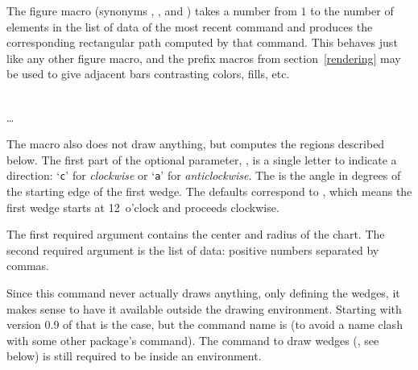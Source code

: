 \documentclass[letterpaper]{article}
\begin{document}
The figure macro  (synonyms , ,
and ) takes a number from $1$ to the number of elements in
the list of data of the most recent  command and produces
the corresponding rectangular path computed by that command. This
behaves just like any other figure macro, and the prefix macros from
section~\ref{rendering} may be used to give adjacent bars contrasting
colors, fills, etc.


\begin{cd}
%
    \\
\dots
{}%
\end{cd}

The macro  also does not draw anything, but computes the
 regions described below. The first part of the optional
parameter, , is a single letter to indicate a direction:
`\texttt{c}' for \emph{clockwise} or `\texttt{a}' for \emph{anticlockwise}.
The  is the angle in degrees of the starting edge of the
first wedge. The defaults correspond to , which means the
first wedge starts at 12~o'clock and proceeds clockwise.

The first required argument contains the center  and radius
 of the chart. The second required argument is the list of
data: positive numbers separated by commas.

Since this command never actually draws anything, only defining the
wedges, it makes sense to have it available outside the drawing
environment. Starting with version 0.9 of \mfp{} that is the case, but
the command name is  (to avoid a name clash with some
other package's  command). The command to draw wedges
(, see below) is still required to be inside an 
environment.

\begin{cd}
%
%
\end{cd}
\end{document}
